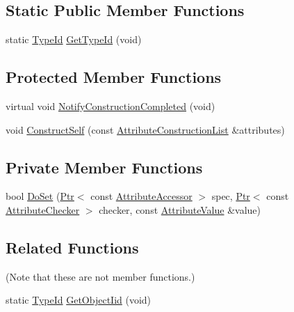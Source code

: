 \subsection*{Static Public Member Functions}
\begin{DoxyCompactItemize}
\item 
static \hyperlink{classns3_1_1TypeId}{Type\+Id} \hyperlink{classns3_1_1ObjectBase_a2b870298ebceaaeffc9d65e15c022eac}{Get\+Type\+Id} (void)
\end{DoxyCompactItemize}
\subsection*{Protected Member Functions}
\begin{DoxyCompactItemize}
\item 
virtual void \hyperlink{classns3_1_1ObjectBase_aa349348317dbdb62a7ee1df89db1eb8b}{Notify\+Construction\+Completed} (void)
\item 
void \hyperlink{classns3_1_1ObjectBase_a5cda18dec6d0744cb652a3ed60056958}{Construct\+Self} (const \hyperlink{classns3_1_1AttributeConstructionList}{Attribute\+Construction\+List} \&attributes)
\end{DoxyCompactItemize}
\subsection*{Private Member Functions}
\begin{DoxyCompactItemize}
\item 
bool \hyperlink{classns3_1_1ObjectBase_afe5f2f7b2fabc99aa33f9bb434e3b695}{Do\+Set} (\hyperlink{classns3_1_1Ptr}{Ptr}$<$ const \hyperlink{classns3_1_1AttributeAccessor}{Attribute\+Accessor} $>$ spec, \hyperlink{classns3_1_1Ptr}{Ptr}$<$ const \hyperlink{classns3_1_1AttributeChecker}{Attribute\+Checker} $>$ checker, const \hyperlink{classns3_1_1AttributeValue}{Attribute\+Value} \&value)
\end{DoxyCompactItemize}
\subsection*{Related Functions}
(Note that these are not member functions.) \begin{DoxyCompactItemize}
\item 
static \hyperlink{classns3_1_1TypeId}{Type\+Id} \hyperlink{classns3_1_1ObjectBase_a4fcfd18844c60f163c5dce52456d111b}{Get\+Object\+Iid} (void)
\end{DoxyCompactItemize}


